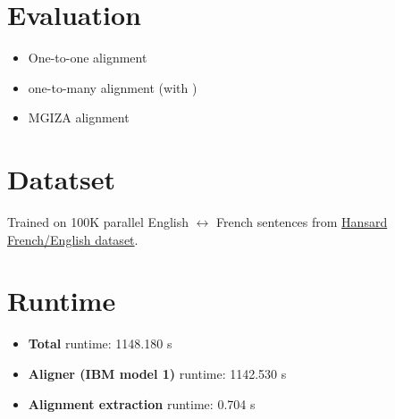 \documentclass{article}[a4paper]
\begin{document}
\section{Evaluation}
\begin{itemize}
    \item One-to-one alignment\\
    \item one-to-many alignment (with )\\

    \item MGIZA alignment\\
    

\end{itemize}


\section{Datatset}
Trained on 100K parallel English $\leftrightarrow$ French sentences from \href{https://catalog.ldc.upenn.edu/LDC95T20}{Hansard French/English dataset}.

\section{Runtime}
\begin{itemize}
    \item \textbf{Total} runtime: 1148.180 s
    \item \textbf{Aligner (IBM model 1)} runtime: 1142.530 s
    \item \textbf{Alignment extraction} runtime: 0.704 s
\end{itemize}
\end{document}
